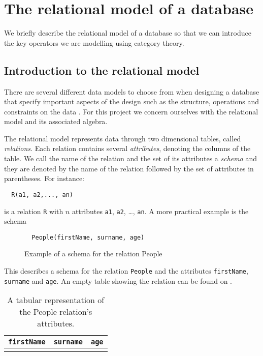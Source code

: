 \section{The relational model of a database}
We briefly describe the relational model of a database so that we can introduce the key operators we are modelling using category theory. 
\subsection{Introduction to the relational model}
There are several different data models to choose from when designing a database that specify important aspects of the design such as the structure, operations and constraints on the data \cite{DatabaseSystems}. For this project we concern ourselves with the relational model and its associated algebra.

The relational model represents data through two dimensional tables, called \emph{relations}. Each relation contains several \emph{attributes}, denoting the columns of the table. We call the name of the relation and the set of its attributes a \emph{schema} and they are denoted by the name of the relation followed by the set of attributes in parentheses.\cite{DatabaseSystems} For instance: 
\begin{center}
\begin{verbatim}
  R(a1, a2,..., an)
\end{verbatim}
\end{center}
is a relation \verb|R| with $n$ attributes \verb|a1|, \verb|a2|, \ldots, \verb|an|. A more practical example is the schema
\begin{figure}[!h]
\begin{verbatim}
  People(firstName, surname, age)
\end{verbatim}
\caption[Schema for the People relation]{Example of a schema for the relation People}
\label{fig:peopleSchema}
\end{figure}
This describes a schema for the relation \verb|People| and the attributes \verb|firstName|, \verb|surname| and \verb|age|.
An empty table showing the relation can be found on .
\begin{table}[h]
  \centering
  \begin{tabular}{l|l|l}
    \verb|firstName| & \verb|surname| & \verb|age| \\
    \hline\hline
    & &\\
  \end{tabular}
  \caption[People relation's headings]{A tabular representation of the People relation's attributes.}
  \label{tab:peopleRelationHeadings}
\end{table}

